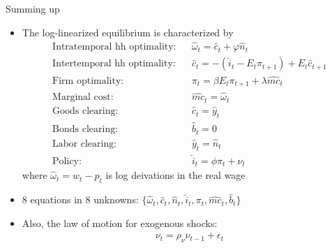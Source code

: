 \documentclass[9pt,xcolor={dvipsnames}]{beamer}
\newcommand{\bit}{\begin{itemize}}
\newcommand{\eit}{\end{itemize}}
\begin{document}
\begin{frame}{Summing up}

\bit
\setlength\itemsep{1.5em}
\item The log-linearized equilibrium is characterized by
\begin{eqnarray}
\text{Intratemporal hh optimality:} && \hat \omega_t = \hat c_t + \varphi \hat n_t  \nonumber \\
\text{Intertemporal hh optimality:} && \hat c_t =  - (\hat i_t - E_t \pi_{t+1}) + E_t \hat c_{t+1}  \nonumber \\
\text{Firm optimality:} && \pi_t = \beta E_t \pi_{t+1} + \lambda \widehat{mc}_t \nonumber \\
\text{Marginal cost:} && \widehat{mc}_t = \hat \omega_t \nonumber \\
\text{Goods clearing:} && \hat c_t = \hat y_t \nonumber \\
\text{Bonds clearing:} && \hat b_t = 0 \nonumber \\
\text{Labor clearing:} && \hat y_t = \hat n_t \nonumber \\
\text{Policy:} && \hat i_t = \phi \pi_t + \nu_t \nonumber 
\end{eqnarray}
where $\hat \omega_t = \hat w_t-p_t$ is log deivations in the real wage

\item 8 equations in 8 unknowns: $\{\hat \omega_t, \hat c_t, \hat n_t, \hat i_{t}, \pi_t, \widehat{mc}_t,\hat b_t\}$
	
\item Also, the law of motion for exogenous shocks:
\begin{eqnarray}
\nu_t = \rho_{\nu} \nu_{t-1} + \epsilon_t \nonumber
\end{eqnarray}
\eit
	
\end{frame}
\end{document}
